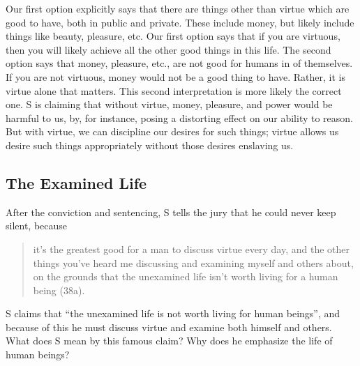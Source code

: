 \documentclass[oneside]{article}
\begin{document}
Our first option explicitly says that there are things other than virtue which are good to have, both in public and private. These include money, but likely include things like beauty, pleasure, etc. Our first option says that if you are virtuous, then you will likely achieve all the other good things in this life. The second option says that money, pleasure, etc., are not good for humans in of themselves. If you are not virtuous, money would not be a good thing to have. Rather, it is virtue alone that matters. This second interpretation is more likely the correct one. S is claiming that without virtue, money, pleasure, and power would be harmful to us, by, for instance, posing a distorting effect on our ability to reason. But with virtue, we can discipline our desires for such things; virtue allows us desire such things appropriately without those desires enslaving us. 

\subsection*{The Examined Life}

After the conviction and sentencing, S tells the jury that he could never keep silent, because
\begin{quote}
it's the greatest good for a man to discuss virtue every day, and the other things you've heard me discussing and examining myself and others about, on the grounds that the unexamined life isn't worth living for a human being (38a).
\end{quote}
S claims that ``the unexamined life is not worth living for human beings'', and because of this he must discuss virtue and examine both himself and others. What does S mean by this famous claim? Why does he emphasize the life of human beings? 


\end{document}
